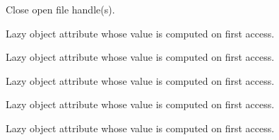 \documentclass[letterpaper,10pt,english]{sphinxmanual}
\begin{document}
\begin{fulllineitems}
\begin{fulllineitems}
\end{fulllineitems}


\begin{fulllineitems}
\label{tifffile:tifffile.TiffFile.close}
Close open file handle(s).

\end{fulllineitems}


\begin{fulllineitems}
\label{tifffile:tifffile.TiffFile.fstat}
Lazy object attribute whose value is computed on first access.

\end{fulllineitems}


\begin{fulllineitems}
\label{tifffile:tifffile.TiffFile.is_bigtiff}
Lazy object attribute whose value is computed on first access.

\end{fulllineitems}


\begin{fulllineitems}
\label{tifffile:tifffile.TiffFile.is_fluoview}
Lazy object attribute whose value is computed on first access.

\end{fulllineitems}


\begin{fulllineitems}
\label{tifffile:tifffile.TiffFile.is_imagej}
Lazy object attribute whose value is computed on first access.

\end{fulllineitems}


\begin{fulllineitems}
\label{tifffile:tifffile.TiffFile.is_lsm}
Lazy object attribute whose value is computed on first access.


\end{fulllineitems}
\end{fulllineitems}
\end{document}

